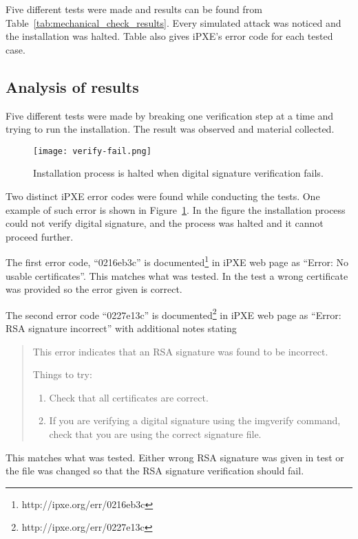 Five different tests were made and results can be found from
Table~\ref{tab:mechanical_check_results}. Every simulated attack was
noticed and the installation was halted. Table also gives iPXE's error
code for each tested case.


\subsection{Analysis of results}

Five different tests were made by breaking one verification step at a
time and trying to run the installation. The result was observed and
material collected.

\begin{figure}[h]
  \caption{Installation process is halted when digital signature
    verification fails.\label{fig:verify-fail}}
  \texttt{[image: verify-fail.png]}
\end{figure}

Two distinct iPXE error codes were found while conducting the
tests. One example of such error is shown in
Figure~\ref{fig:verify-fail}. In the figure the installation process
could not verify digital signature, and the process was halted and it
cannot proceed further.

The first error code, ``0216eb3c'' is
documented\footnote{http://ipxe.org/err/0216eb3c} in iPXE web page as
``Error: No usable certificates''. This matches what was tested. In
the test a wrong certificate was provided so the error given is
correct.

The second error code ``0227e13c'' is
documented\footnote{http://ipxe.org/err/0227e13c} in iPXE web page as
``Error: RSA signature incorrect'' with additional notes stating

\begin{quote}
This error indicates that an RSA signature was found to be incorrect.

Things to try:

\begin{enumerate}
\item Check that all certificates are correct.
\item If you are verifying a digital signature using the imgverify
  command, check that you are using the correct signature file.
\end{enumerate}
\end{quote}

This matches what was tested. Either wrong RSA signature was given in
test or the file was changed so that the RSA signature verification
should fail.

